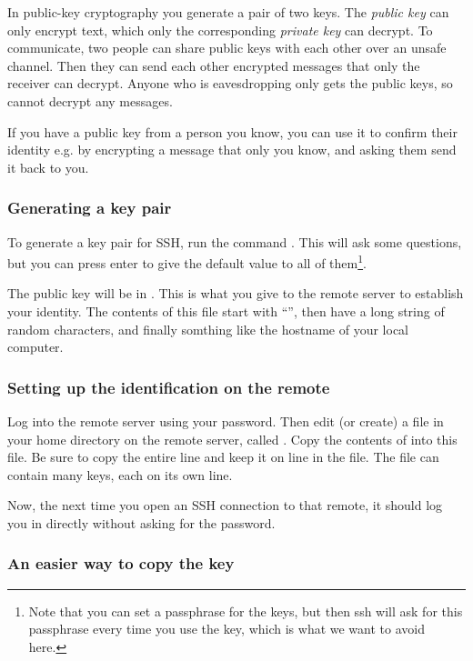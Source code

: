 In public-key cryptography you generate a pair of two keys. The \emph{public
key} can only encrypt text, which only the corresponding \emph{private key} can
decrypt. To communicate, two people can share public keys with each other over
an unsafe channel. Then they can send each other encrypted messages that only
the receiver can decrypt. Anyone who is eavesdropping only gets the public
keys, so cannot decrypt any messages.

If you have a public key from a person you know, you can use it to confirm
their identity e.g. by encrypting a message that only you know, and asking them
send it back to you.

\subsubsection{Generating a key pair}

To generate a key pair for SSH, run the command . This will ask
some questions, but you can press enter to give the default value to all of
them\footnote{Note that you can set a passphrase for the keys, but then ssh
will ask for this passphrase every time you use the key, which is what we want
to avoid here.}.

The public key will be in . This is what you give to the
remote server to establish your identity. The contents of this file start with
``'', then have a long string of random characters, and finally
somthing like the hostname of your local computer.

\subsubsection{Setting up the identification on the remote}

Log into the remote server using your password. Then edit (or create) a file in
your home directory on the remote server, called .
Copy the contents of  into this file. Be sure to copy the
entire line and keep it on line in the file. The  file can
contain many keys, each on its own line.

Now, the next time you open an SSH connection to that remote, it should log you
in directly without asking for the password.

\subsubsection{An easier way to copy the key}


